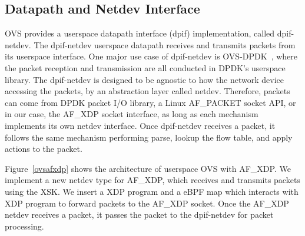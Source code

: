 \documentclass[10pt]{sigplanconf}
\begin{document}
\subsection{Datapath and Netdev Interface}
OVS provides a userspace datapath interface (dpif) implementation, called
dpif-netdev. The dpif-netdev userspace datapath receives and transmits
packets from its userspace interface.  One major use case of dpif-netdev
is OVS-DPDK~\cite{ovsdpdk}, where the packet reception and transmission
are all conducted in DPDK's userspace
library. The dpif-netdev is designed to be agnostic to how the network
device accessing the packets, by an abstraction layer called netdev.
Therefore, packets can come from DPDK packet I/O library,
a Linux AF\_PACKET socket API, or in our case, the AF\_XDP socket interface,
as long as each mechanism implements its own netdev interface.
Once dpif-netdev receives a packet, it follows the same mechanism performing
parse, lookup the flow table, and apply actions to the packet.

Figure~\ref{ovsafxdp} shows the architecture of userspace OVS with AF\_XDP.
We implement a new netdev type for AF\_XDP, which receives and transmits
packets using the XSK.  We insert a XDP program and a eBPF map which interacts
with XDP program to forward packets to the AF\_XDP socket.
Once the AF\_XDP netdev receives a packet, it passes the packet to the
dpif-netdev for packet processing.
\end{document}
